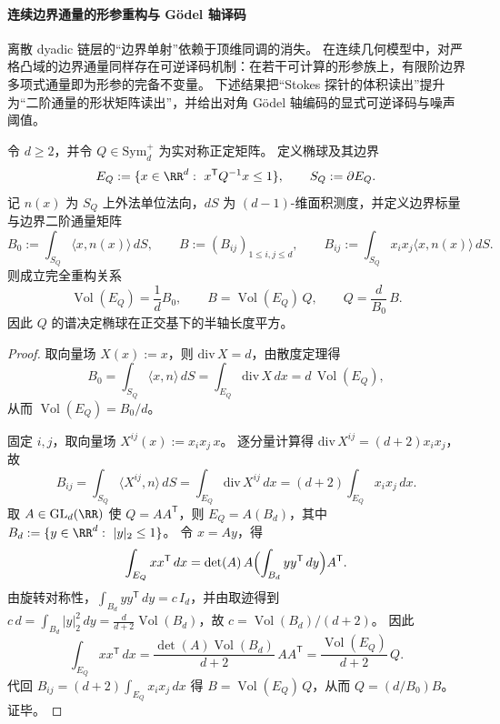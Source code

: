 



\paragraph{连续边界通量的形参重构与 Gödel 轴译码}
离散 dyadic 链层的“边界单射”依赖于顶维同调的消失。
在连续几何模型中，对严格凸域的边界通量同样存在可逆译码机制：在若干可计算的形参族上，有限阶边界多项式通量即为形参的完备不变量。
下述结果把“Stokes 探针的体积读出”提升为“二阶通量的形状矩阵读出”，并给出对角 Gödel 轴编码的显式可逆译码与噪声阈值。

\begin{theorem}[椭球形状矩阵的边界通量重构]\label{thm:spg-ellipsoid-boundary-flux-reconstruction}
令 \(d\ge 2\)，并令 \(Q\in\mathrm{Sym}_d^{+}\) 为实对称正定矩阵。
定义椭球及其边界
\[
E_Q:=\{x\in\RR^d:\ x^{\mathsf T}Q^{-1}x\le 1\},
\qquad
S_Q:=\partial E_Q.
\]
记 \(n(x)\) 为 \(S_Q\) 上外法单位法向，\(dS\) 为 \((d-1)\)-维面积测度，并定义边界标量与边界二阶通量矩阵
\[
B_0:=\int_{S_Q}\langle x,n(x)\rangle\,dS,
\qquad
B:=(B_{ij})_{1\le i,j\le d},\qquad
B_{ij}:=\int_{S_Q}x_ix_j\langle x,n(x)\rangle\,dS.
\]
则成立完全重构关系
\[
\operatorname{Vol}(E_Q)=\frac{1}{d}B_0,
\qquad
B=\operatorname{Vol}(E_Q)\,Q,
\qquad
Q=\frac{d}{B_0}\,B.
\]
因此 \(Q\) 的谱决定椭球在正交基下的半轴长度平方。
\end{theorem}
\begin{proof}
取向量场 \(X(x):=x\)，则 \(\mathrm{div}\,X=d\)，由散度定理得
\[
B_0=\int_{S_Q}\langle x,n\rangle\,dS=\int_{E_Q}\mathrm{div}\,X\,dx=d\,\operatorname{Vol}(E_Q),
\]
从而 \(\operatorname{Vol}(E_Q)=B_0/d\)。
\par
固定 \(i,j\)，取向量场 \(X^{ij}(x):=x_ix_j\,x\)。
逐分量计算得 \(\mathrm{div}\,X^{ij}=(d+2)x_ix_j\)，故
\[
B_{ij}=\int_{S_Q}\langle X^{ij},n\rangle\,dS=\int_{E_Q}\mathrm{div}\,X^{ij}\,dx
=(d+2)\int_{E_Q}x_ix_j\,dx.
\]
取 \(A\in\mathrm{GL}_d(\RR)\) 使 \(Q=AA^{\mathsf T}\)，则 \(E_Q=A(B_d)\)，其中 \(B_d:=\{y\in\RR^d:\ |y|_2\le 1\}\)。
令 \(x=Ay\)，得
\[
\int_{E_Q}xx^{\mathsf T}\,dx
=\det(A)\,A\Bigl(\int_{B_d}yy^{\mathsf T}\,dy\Bigr)A^{\mathsf T}.
\]
由旋转对称性，\(\int_{B_d}yy^{\mathsf T}\,dy=c\,I_d\)，并由取迹得到
\(
c\,d=\int_{B_d}|y|_2^2\,dy=\frac{d}{d+2}\operatorname{Vol}(B_d)
\)，故 \(c=\operatorname{Vol}(B_d)/(d+2)\)。
因此
\[
\int_{E_Q}xx^{\mathsf T}\,dx
=\frac{\det(A)\operatorname{Vol}(B_d)}{d+2}\,AA^{\mathsf T}
=\frac{\operatorname{Vol}(E_Q)}{d+2}\,Q.
\]
代回 \(B_{ij}=(d+2)\int_{E_Q}x_ix_j\,dx\) 得 \(B=\operatorname{Vol}(E_Q)\,Q\)，从而 \(Q=(d/B_0)B\)。证毕。
\end{proof}

